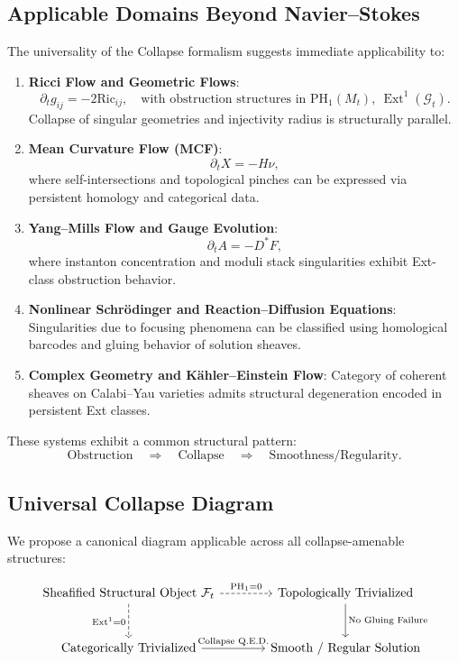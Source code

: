 \documentclass[11pt]{article}
\DeclareMathOperator{\Ext}{Ext}
\begin{document}
\subsection{Applicable Domains Beyond Navier--Stokes}

The universality of the Collapse formalism suggests immediate applicability to:

\begin{enumerate}
  \item \textbf{Ricci Flow and Geometric Flows}:
  \[
  \partial_t g_{ij} = -2 \mathrm{Ric}_{ij}, \quad \text{with obstruction structures in } \mathrm{PH}_1(M_t),\ \Ext^1(\mathcal{G}_t).
  \]
  Collapse of singular geometries and injectivity radius is structurally parallel.

  \item \textbf{Mean Curvature Flow (MCF)}:
  \[
  \partial_t X = - H \nu,
  \]
  where self-intersections and topological pinches can be expressed via persistent homology and categorical data.

  \item \textbf{Yang–Mills Flow and Gauge Evolution}:
  \[
  \partial_t A = - D^*F,
  \]
  where instanton concentration and moduli stack singularities exhibit Ext-class obstruction behavior.

  \item \textbf{Nonlinear Schrödinger and Reaction–Diffusion Equations}:
  Singularities due to focusing phenomena can be classified using homological barcodes and gluing behavior of solution sheaves.

  \item \textbf{Complex Geometry and Kähler–Einstein Flow}:
  Category of coherent sheaves on Calabi–Yau varieties admits structural degeneration encoded in persistent Ext classes.
\end{enumerate}

These systems exhibit a common structural pattern:
\[
\text{Obstruction} \quad \Longrightarrow \quad \text{Collapse} \quad \Longrightarrow \quad \text{Smoothness/Regularity}.
\]

\subsection{Universal Collapse Diagram}

We propose a canonical diagram applicable across all collapse-amenable structures:

\[
\begin{tikzcd}[column sep=large, row sep=large]
\text{Sheafified Structural Object } \mathcal{F}_t
  \arrow[r, "\mathrm{PH}_1 = 0", dashed]
  \arrow[d, "\mathrm{Ext}^1 = 0"', dashed]
& \text{Topologically Trivialized}
  \arrow[d, "\text{No Gluing Failure}"] \\
\text{Categorically Trivialized}
  \arrow[r, "\text{Collapse Q.E.D.}"]
& \text{Smooth / Regular Solution}
\end{tikzcd}
\]
\end{document}
